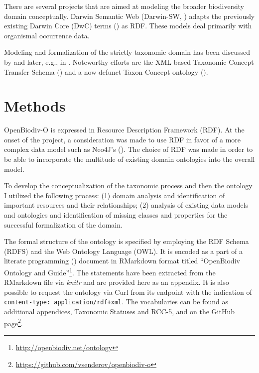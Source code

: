 There are several projects that are aimed at modeling the broader biodiversity domain conceptually. Darwin Semantic Web (Darwin-SW, \cite{baskauf_darwin-sw:_2016}) adapts the previously existing Darwin Core (DwC) terms (\cite{wieczorek_darwin_2012}) as RDF. These models deal primarily with organismal occurrence data.

Modeling and formalization of the strictly taxonomic domain has been discussed by \cite{berendsohn_concept_1995} and later, e.g., in \cite{franz_perspectives:_2009,sterner_taxonomy_2017}. Noteworthy efforts are the XML-based Taxonomic Concept Transfer Schema (\cite{taxonomic_names_and_concepts_interest_group_taxonomic_2006}) and a now defunct Taxon Concept ontology (\cite{devries_taxon_nodate}).

\section{Methods}

OpenBiodiv-O is expressed in Resource Description Framework (RDF). At the onset of the project, a consideration was made to use RDF in favor of a more complex data model such as Neo4J's (\cite{senderov_open_2016}). The choice of RDF was made in order to be able to incorporate the multitude of existing domain ontologies into the overall model.

To develop the conceptualization of the taxonomic process and then the ontology I utilized the following process: (1) domain analysis and identification of important resources and their relationships; (2) analysis of existing data models and ontologies and identification of missing classes and properties for the successful formalization of the domain.

The formal structure of the ontology is specified by employing the RDF Schema (RDFS) and the Web Ontology Language (OWL). It is encoded as a part of a literate programming (\cite{knuth_literate_1984}) document in RMarkdown format titled ``OpenBiodiv Ontology and Guide''\footnote{\href{http://openbiodiv.net/ontology}{http://openbiodiv.net/ontology}}. The statements have been extracted from the RMarkdown file via \emph{knitr} and are provided here as an appendix. It is also possible to request the ontology via Curl from its endpoint with the indication of {\tt content-type: application/rdf+xml}. The vocabularies can be found as additional appendices, Taxonomic Statuses and RCC-5, and on the GitHub page\footnote{\href{https://github.com/vsenderov/openbiodiv-o}{https://github.com/vsenderov/openbiodiv-o}}.

